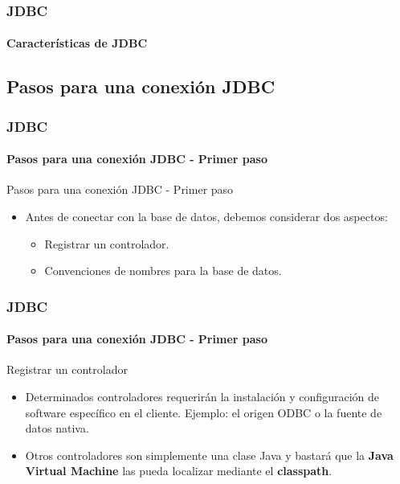 \documentclass{beamer}
\begin{document}
	\begin{frame}
		\frametitle{JDBC}
		\framesubtitle{Caracter\'isticas de JDBC}

		    \begin{center}
			\end{center}
	\end{frame}

    \subsection{Pasos para una conexi\'on JDBC}	

	\begin{frame}
		\frametitle{JDBC}
		\framesubtitle{Pasos para una conexi\'on JDBC - Primer paso}

        \begin{exampleblock}{Pasos para una conexi\'on JDBC - Primer paso}
		    \begin{itemize}
		        \item Antes de conectar con la base de datos, debemos considerar dos aspectos:
		        \begin{itemize}
		            \item Registrar un controlador.
		            \item Convenciones de nombres para la base de datos.
		        \end{itemize}
		    \end{itemize}
		    \end{exampleblock}
	\end{frame}

	\begin{frame}
		\frametitle{JDBC}
		\framesubtitle{Pasos para una conexi\'on JDBC - Primer paso}

        \begin{exampleblock}{Registrar un controlador}
		    \begin{itemize}
		        \item Determinados controladores requerir\'an la instalaci\'on y configuraci\'on de software espec\'ifico en el cliente. Ejemplo: el origen ODBC o la fuente de datos nativa.		        
		        \item Otros controladores son simplemente una clase Java y bastar\'a que la \textbf{Java Virtual Machine} las pueda localizar mediante el \textbf{classpath}.
		    \end{itemize}
		    \end{exampleblock}
	\end{frame}
\end{document}
